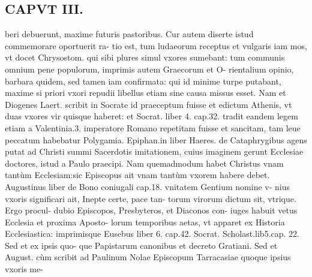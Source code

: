 \documentclass{article}
\begin{document}
\begin{pages}
\section*{CAPVT  III. }
\marginpar{[ p.107 ]}\pstart beri debuerunt, maxime futuris pastoribus. Cur autem diserte istud commemorare oportuerit ra- tio est, tum ludaeorum receptus et vulgaris iam mos, vt docet Chrysostom. qui sibi plures simul vxores sumebant: tum communis omnium pene populorum, imprimis autem Graecorum et O- rientalium opinio, barbara quidem, sed tamen iam confirmata: qui id minime turpe putabant, maxime si priori vxori repudii libellus etiam sine causa missus esset. Nam et Diogenes Laert. scribit in Socrate id praeceptum fuisse et edictum Athenis, vt duas vxores vir quisque haberet: et Socrat. liber 4. cap.32. tradit eandem legem etiam a Valentinia.3. imperatore Romano repetitam fuisse et sancitam, tam leue peccatum habebatur Polygamia.  \pend\pstart Epiphan.in liber  Haeres. de Cataphrygibus  agens putat ad Christi summi Sacerdotis imitationem, cuius imaginem gerunt Ecclesiae doctores, istud a Paulo praecipi. Nam quemadmodum habet Christus vnam tantùm Ecclesiam:sic Episcopus ait vnam tantùm vxorem habere debet. Augustinus liber  de Bono coniugali cap.18. vnitatem Gentium nomine v- nius vxoris significari ait, Inepte certe, pace tan- torum virorum dictum sit, vtrique. Ergo procul- dubio Episcopos, Presbyteros, et Diaconos con- iuges habuit vetus Ecclesia et proxima Aposto- lorum temporibus aetas, vt apparet ex Historia Ecclesiastica: imprimisque Eusebus liber  6. cap.42. Socrat. Scholast.lib5.cap. 22. Sed et ex ipsis quo- que Papistarum canonibus et decreto Gratiani. Sed et August. cùm scribit ad Paulinum Nolae Episcopum Tarracasiae quoque ipsius vxoris me-  \pend

\end{pages}
\end{document}
